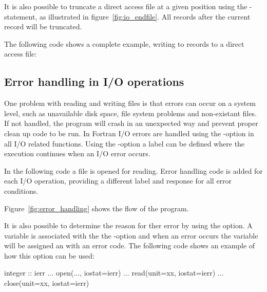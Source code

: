 
It is also possible to truncate a direct access file at a given position using the -statement, as illustrated in figure~\ref{fig:io_endfile}. All records after the current record will be truncated.


The following code shows a complete example, writing to records to a direct access file:


\subsection{Error handling in I/O operations}

One problem with reading and writing files is that errors can occur on a system level, such as unavailable disk space, file system problems and non-existant files. If not handled, the program will crash in an unexpected way and prevent proper clean up code to be run. In Fortran I/O errors are handled using the -option in all I/O related functions. Using the -option a label can be defined where the execution continues when an I/O error occurs.

In the following code a file is opened for reading. Error handling code is added for each I/O operation, providing a different label and response for all error conditions.


Figure~\ref{fig:error_handling} shows the flow of the program.


\newpage
It is also possible to determine the reason for ther error by using the  option. A variable is associated with the the -option and when an error occurs the variable will be assigned an with an error code. The following code shows an example of how this option can be used:

\begin{fortrancodeenv}
integer :: ierr
...
open(..., iostat=ierr)
...
read(unit=xx, iostat=ierr)
...
close(unit=xx, iostat=ierr)
\end{fortrancodeenv}

